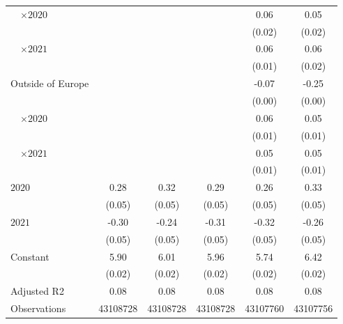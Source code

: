 \begin{tabular}{@{}l*{5}{S[table-format={-}2.2{\tnote{***}}]}@{}}
~~\(\times 2020\) &  &  &  & 0.06\tnote{***} & \vphantom{1} 0.05\tnote{***}\tabularnewline%
 &  &  &  & (0.02) & (0.02)\tabularnewline%
~~\(\times 2021\) &  &  &  & 0.06\tnote{***} & 0.06\tnote{***}\tabularnewline%
 &  &  &  & (0.01) & (0.02)\tabularnewline%
Outside of Europe &  &  &  & -0.07\tnote{***} & -0.25\tnote{***}\tabularnewline%
 &  &  &  & (0.00) & (0.00)\tabularnewline%
~~\(\times 2020\) &  &  &  & 0.06\tnote{***} & 0.05\tnote{***}\tabularnewline%
 &  &  &  & (0.01) & \vphantom{1} (0.01)\tabularnewline%
~~\(\times 2021\) &  &  &  & 0.05\tnote{***} & 0.05\tnote{***}\tabularnewline%
 &  &  &  & (0.01) & (0.01)\tabularnewline%
\midrule
\(2020\) & 0.28\tnote{***} & 0.32\tnote{***} & 0.29\tnote{***} & 0.26\tnote{***} & 0.33\tnote{***}\tabularnewline%
 & (0.05) & (0.05) & (0.05) & (0.05) & \vphantom{1} (0.05)\tabularnewline%
\(2021\) & -0.30\tnote{***} & -0.24\tnote{***} & -0.31\tnote{***} & -0.32\tnote{***} & -0.26\tnote{***}\tabularnewline%
 & (0.05) & (0.05) & (0.05) & (0.05) & (0.05)\tabularnewline%
Constant & 5.90\tnote{***} & 6.01\tnote{***} & 5.96\tnote{***} & 5.74\tnote{***} & 6.42\tnote{***}\tabularnewline%
 & (0.02) & (0.02) & (0.02) & (0.02) & (0.02)\tabularnewline%
\midrule
Adjusted R2 & 0.08 & 0.08 & 0.08 & 0.08 & 0.08\tabularnewline%
Observations & {\num{43108728}} & {\num{43108728}} & {\num{43108728}} & {\num{43107760}} & {\num{43107756}}\tabularnewline%
\bottomrule
\end{tabular}
